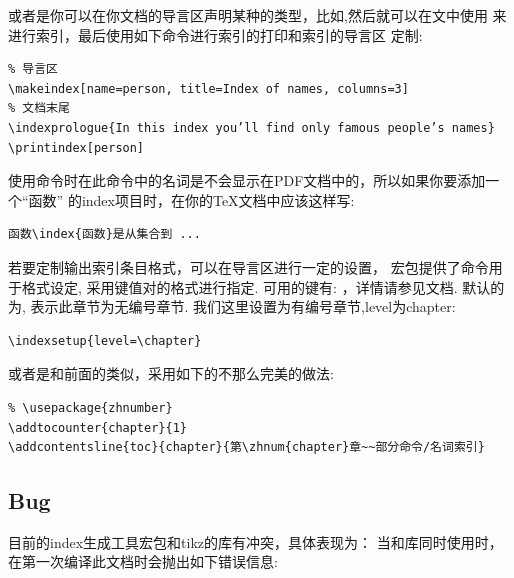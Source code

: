 或者是你可以在你文档的导言区声明某种的类型，比如,然后就可以在文中使用
 来进行索引，最后使用如下命令进行索引的打印和索引的导言区
定制:

\begin{verbatim}
% 导言区
\makeindex[name=person, title=Index of names, columns=3]
% 文档末尾
\indexprologue{In this index you’ll find only famous people’s names}
\printindex[person]
\end{verbatim}

使用\cmd{\index}命令时在此命令中的名词是不会显示在PDF文档中的，所以如果你要添加一个``函数''
的index项目时，在你的\TeX{}文档中应该这样写:

\begin{verbatim}
函数\index{函数}是从集合到 ...
\end{verbatim}

若要定制\cmd{\printindex}输出索引条目格式，可以在导言区进行一定的设置，
宏包提供了命令\cmd{\indexsetup{}}用于格式设定, 采用键值对的格式进行指定. 可用的键有:
，详情请参见文档. 默认的为,
表示此章节为无编号章节. 我们这里设置为有编号章节,level为chapter:
\begin{verbatim}
\indexsetup{level=\chapter}
\end{verbatim}

或者是和前面的\cmd{\printbibliography}类似，采用如下的不那么完美的做法:
\begin{verbatim}
% \usepackage{zhnumber}
\addtocounter{chapter}{1}
\addcontentsline{toc}{chapter}{第\zhnum{chapter}章~~部分命令/名词索引}
\end{verbatim}

\subsection{Bug}
目前的index生成工具宏包和tikz的库有冲突，具体表现为：
当和库同时使用时，在第一次编译此文档时会抛出如下错误信息:

